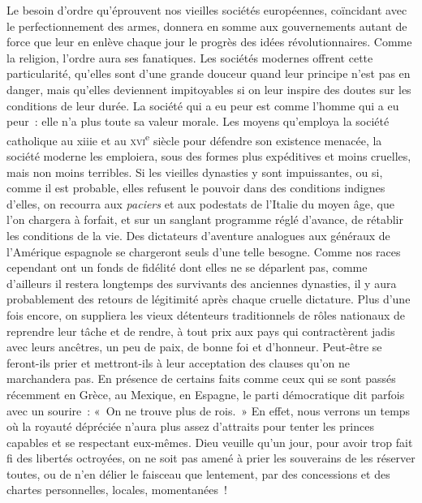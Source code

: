 \documentclass[french,twoside]{book} %
\begin{document}
Le besoin d’ordre qu’éprouvent nos vieilles sociétés européennes, coïncidant avec le perfectionnement des armes, donnera en somme aux gouvernements autant de force que leur en enlève chaque jour le progrès des idées révolutionnaires. Comme la religion, l’ordre aura ses fanatiques. Les sociétés modernes offrent cette particularité, qu’elles sont d’une grande douceur quand leur principe n’est pas en danger, mais qu’elles deviennent impitoyables si on leur inspire des doutes sur les conditions de leur durée. La société qui a eu peur est comme l’homme qui a eu peur : elle n’a plus toute sa valeur morale. Les moyens qu’employa la société catholique au xiiie et au \textsc{xvi}\textsuperscript{e} siècle pour défendre son existence menacée, la société moderne les emploiera, sous des formes plus expéditives et moins cruelles, mais non moins terribles. Si les vieilles dynasties y sont impuissantes, ou si, comme il est probable, elles refusent le pouvoir dans des conditions indignes d’elles, on recourra aux {\itshape paciers} et aux podestats de l’Italie du moyen âge, que l’on chargera à forfait, et sur un sanglant programme réglé d’avance, de rétablir les conditions de la vie. Des dictateurs d’aventure analogues aux généraux de l’Amérique espagnole se chargeront seuls d’une telle besogne. Comme nos races cependant ont un fonds de fidélité dont elles ne se déparlent pas, comme d’ailleurs il restera longtemps des survivants des anciennes dynasties, il y aura probablement des retours de légitimité après chaque cruelle dictature. Plus d’une fois encore, on suppliera les vieux détenteurs traditionnels de rôles nationaux de reprendre leur tâche et de rendre, à tout prix aux pays qui contractèrent jadis avec leurs ancêtres, un peu de paix, de bonne foi et d’honneur. Peut-être se feront-ils prier et mettront-ils à leur acceptation des clauses qu’on ne marchandera pas. En présence de certains faits comme ceux qui se sont passés récemment en Grèce, au Mexique, en Espagne, le parti démocratique dit parfois avec un sourire : « On ne trouve plus de rois. » En effet, nous verrons un temps où la royauté dépréciée n’aura plus assez d’attraits pour tenter les princes capables et se respectant eux-mêmes. Dieu veuille qu’un jour, pour avoir trop fait fi des libertés octroyées, on ne soit pas amené à prier les souverains de les réserver toutes, ou de n’en délier le faisceau que lentement, par des concessions et des chartes personnelles, locales, momentanées !\par
\end{document}
